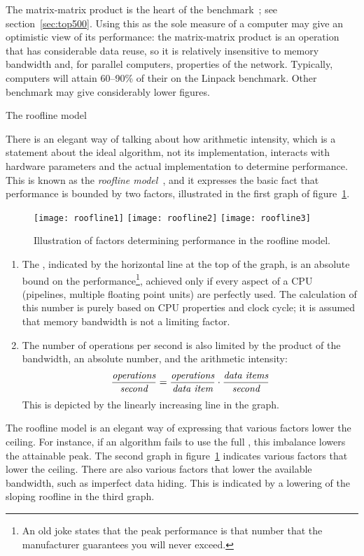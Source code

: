 The matrix-matrix product is the heart of the 
{benchmark}~\cite{Dongarra1987LinpackBenchmark}; see
section~\ref{sec:top500}.
Using this as the sole measure of
 a computer may give an optimistic view of its
performance: the matrix-matrix product is an operation
that has considerable data reuse, so it is relatively insensitive to
memory bandwidth and, for parallel computers, properties of the
network. Typically, computers will attain 60--90\% of their
 on the Linpack benchmark. Other benchmark
may give considerably lower figures.

 {The roofline model}
\label{sec:roofline}

There is an elegant way of talking about how arithmetic intensity,
which is a statement about the ideal algorithm, not its implementation,
interacts with hardware parameters and the actual implementation
to determine performance.
This is known as the \emph{roofline model}~\cite{Williams:2009:roofline},
and it expresses the basic fact that performance is bounded by two factors,
illustrated in the first graph of figure~\ref{fig:roofline}.
\begin{figure}[p]

  \texttt{[image: roofline1]}
  \texttt{[image: roofline2]}
  \texttt{[image: roofline3]}

  \caption{Illustration of factors determining performance in the roofline model.}
  \label{fig:roofline}
\end{figure}
\begin{enumerate}
\item The , indicated by the horizontal
  line at the top of the graph, is an absolute bound on the
  performance\footnote
    {An old joke states that the peak performance
    is that number that the manufacturer guarantees you will never
    exceed.}, achieved only if every aspect of a \ac{CPU} (pipelines,
  multiple floating point units) are perfectly used. The calculation
  of this number is purely based on \ac{CPU} properties and clock cycle; it
  is assumed that memory bandwidth is not a limiting factor.
\item The number of operations per second is also limited by the
  product of the bandwidth, an absolute number, and the arithmetic
  intensity:
  \[ \frac{\hbox{\it operations}}{\hbox{\it second}}=
  \frac{\hbox{\it operations}}{\hbox{\it data item}}\cdot
  \frac{\hbox{\it data items}}{\hbox{\it second}}
  \]
  This is depicted by the linearly increasing line in the graph.
\end{enumerate}
The roofline model is an elegant way of expressing that various
factors lower the ceiling.  For instance, if an algorithm fails to use
the full , this imbalance lowers the
attainable peak.  The second graph in figure~\ref{fig:roofline}
indicates various factors that lower the ceiling.
%
There are also various factors that lower the available bandwidth,
such as imperfect data hiding. This is indicated by a lowering of the 
sloping roofline in the third graph.

